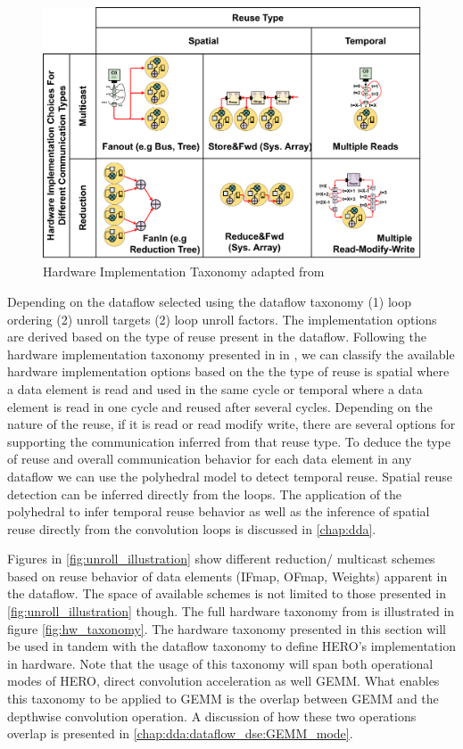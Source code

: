 \begin{figure}[ht]
    \centering
    \includegraphics[scale=0.58]{fig/hw_taxonomy.pdf}
    \caption{Hardware Implementation Taxonomy adapted from \cite{maestro}}
    \label{fig:hw_taxonomy}
\end{figure}


Depending on the dataflow selected using the dataflow taxonomy (1) loop ordering
(2) unroll targets (2) loop unroll factors. The implementation options are
derived based on the type of reuse present in the dataflow. Following the
hardware implementation taxonomy presented in in \cite{maestro}, we can classify
the available hardware implementation options based on the the type of reuse is
spatial where a data element is read and used in the same cycle or temporal
where a data element is read in one cycle and reused after several cycles.
Depending on the nature of the reuse, if it is read or read modify write, there
are several options for supporting the communication inferred from that reuse
type. To deduce the type of reuse and overall communication behavior for each
data element in any dataflow we can use the polyhedral model to detect temporal
reuse. Spatial reuse detection can be inferred directly from the loops. The
application of the polyhedral to infer temporal reuse behavior as well as the
inference of spatial reuse directly from the convolution loops is discussed in
\autoref{chap:dda}.

Figures in \autoref{fig:unroll_illustration} show different reduction/ multicast
schemes based on reuse behavior of data elements (IFmap, OFmap, Weights)
apparent in the dataflow. The space of available schemes is not limited to those
presented in \autoref{fig:unroll_illustration} though. The full hardware
taxonomy from \cite{maestro} is illustrated in figure \autoref{fig:hw_taxonomy}.
The hardware taxonomy presented in this section will be used in tandem with the
dataflow taxonomy to define HERO's implementation in hardware. Note that the
usage of this taxonomy will span both operational modes of HERO, direct
convolution acceleration as well GEMM. What enables this taxonomy to be applied
to GEMM is the overlap between GEMM and the depthwise convolution operation. A
discussion of how these two operations overlap is presented in
\autoref{chap:dda:dataflow_dse:GEMM_mode}. 


